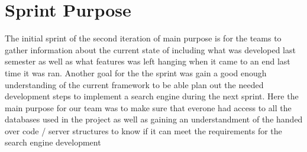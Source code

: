 \section{Sprint Purpose}
The initial sprint of the second iteration of \knox main purpose is for the teams to gather information about the current state of \knox including what was developed last semester as well as what features was left hanging when it came to an end last time it was ran. Another goal for the the sprint was gain a good enough understanding of the current framework to be able plan out the needed development steps to implement a search engine during the next sprint. 
Here the main purpose for our team was to make sure that everone had access to all the databases used in the project as well as gaining an understandment of the handed over code / server structures to know if it can meet the requirements for the search engine development 

